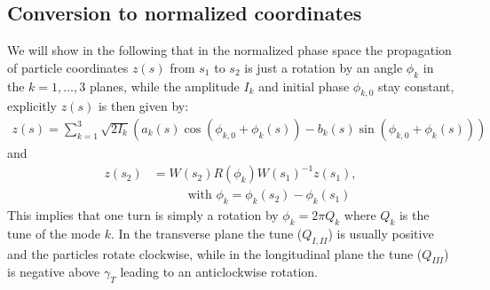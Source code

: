 \documentclass[english]{article}
\begin{document}
\subsection{Conversion to normalized coordinates}
\label{opt:sec:3}
We will show in the following that in the normalized phase space the propagation of particle coordinates $z(s)$ from $s_1$ to $s_2$ is just a rotation by an angle $\phi_k$ in the $k=1,\ldots,3$ planes, while the amplitude $I_k$ and initial phase $\phi_{k,0}$ stay constant, explicitly $z(s)$ is then given by:
\begin{align}\label{opt:eqn:3:3}
z(s)=\sum_{k=1}^3 \sqrt{2I_k}\left(
a_k(s) \cos \left(\phi_{k,0} + \phi_k(s)\right) -
b_k(s) \sin \left(\phi_{k,0} + \phi_k(s)\right)
\right) 
\end{align}
and
\begin{align}
z(s_2)&=W(s_2)R(\phi_k)W(s_1)^{-1}z(s_1), \\
&\hspace{30pt} \text{ with } \phi_k=\phi_k(s_2)-\phi_k(s_1)\nonumber
\end{align}
This implies that one turn is simply a rotation by $\phi_k=2\pi Q_k$ where $Q_k$ is the tune of the mode $k$. In the transverse plane the tune ($Q_{I,II}$) is usually positive and the particles rotate clockwise, while in the longitudinal plane the tune ($Q_{III}$) is negative above $\gamma_T$ leading to an anticlockwise rotation.
\end{document}

